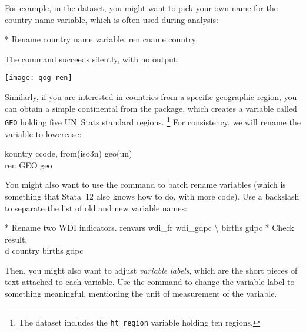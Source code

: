 For example, in the \qog dataset, you might want to pick your own name for the country name variable, which is often used during analysis:%

	\begin{docspec}
    * Rename country name variable.
    ren cname country
  \end{docspec}

  The  command succeeds silently, with no output:

	\texttt{[image: qog-ren]}

\label{qog:geo}%
Similarly, if you are interested in countries from a specific geographic region, you can obtain a simple continental from the  package, which creates a variable called \texttt{GEO} holding five UN~Stats standard regions.%
  \footnote{The \qog dataset includes the \texttt{ht\_region} variable holding ten regions.} %
  For consistency, we will rename the variable to lowercase:%

  	\begin{docspec}
      kountry ccode, from(iso3n) geo(un)\\
      ren GEO geo
    \end{docspec}

  
You might also want to use the   command to batch rename variables (which is something that Stata~12 also knows how to do, with more code). Use a backslash to separate the list of old and new variable names:%

	\begin{docspec}
    * Rename two WDI indicators.
    renvars wdi\_fr wdi\_gdpc \textbackslash{} births gdpc
		* Check result.\\
		d country births gdpc
	\end{docspec}

%
Then, you might also want to adjust \emph{variable labels}, which are the short pieces of text attached to each variable. Use the  command to change the variable label to something meaningful, \eg mentioning the unit of measurement of the variable.%

